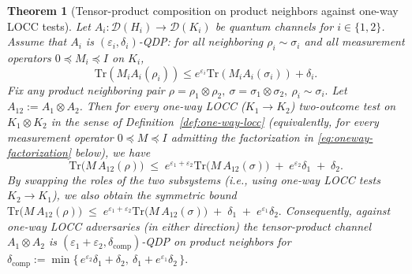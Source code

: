 \documentclass[11pt]{article}
\def\Tr{\mathrm{Tr}}
\theoremstyle{plain}
\newtheorem{theorem}[theo]{Theorem}
\theoremstyle{remark}
\begin{document}
\begin{theorem}[Tensor-product composition on product neighbors against one-way LOCC tests]
\label{thm:comp-oneway-locc-clean}
Let $A_i:\mathcal{D}(H_i)\to\mathcal{D}(K_i)$ be quantum channels for $i\in\{1,2\}$.
Assume that $A_i$ is $(\varepsilon_i,\delta_i)$-QDP:
for all neighboring
$\rho_i\sim\sigma_i$ and all measurement operators $0\preceq M_i\preceq I$ on $K_i$,
\[
\Tr(M_iA_i(\rho_i)) \le e^{\varepsilon_i}\Tr(M_iA_i(\sigma_i))+\delta_i.
\]
Fix any \emph{product} neighboring pair
$\rho=\rho_1\otimes\rho_2, \ \sigma=\sigma_1\otimes\sigma_2, \ \rho_i\sim\sigma_i.$
Let $A_{12}:=A_1\otimes A_2$. Then for every one-way LOCC ($K_1\to K_2$) two-outcome test on
$K_1\otimes K_2$ in the sense of Definition~\ref{def:one-way-locc} (equivalently, for every measurement operator $0\preceq M\preceq I$
admitting the factorization in \eqref{eq:oneway-factorization} below), we have
\begin{equation}
\label{eq:oneway-comp-bound}
\Tr\!\big(M\,A_{12}(\rho)\big)
\;\le\;
e^{\varepsilon_1+\varepsilon_2}\Tr\!\big(M\,A_{12}(\sigma)\big)
\;+\; e^{\varepsilon_2}\delta_1 \;+\; \delta_2.
\end{equation}
By swapping the roles of the two subsystems (i.e., using one-way LOCC tests $K_2\to K_1$),
we also obtain the symmetric bound
$
\Tr\!\big(M\,A_{12}(\rho)\big)
\;\le\;
e^{\varepsilon_1+\varepsilon_2}\Tr\!\big(M\,A_{12}(\sigma)\big)
\;+\; \delta_1 \;+\; e^{\varepsilon_1}\delta_2.$
Consequently, against one-way LOCC adversaries (in either direction) the tensor-product channel
$A_1\otimes A_2$ is $(\varepsilon_1+\varepsilon_2,\delta_{\mathrm{comp}})$-QDP on product neighbors
for
$
\delta_{\mathrm{comp}}:=\min\{\,e^{\varepsilon_2}\delta_1+\delta_2,\ \delta_1+e^{\varepsilon_1}\delta_2\,\}.
$
\end{theorem}
\end{document}
